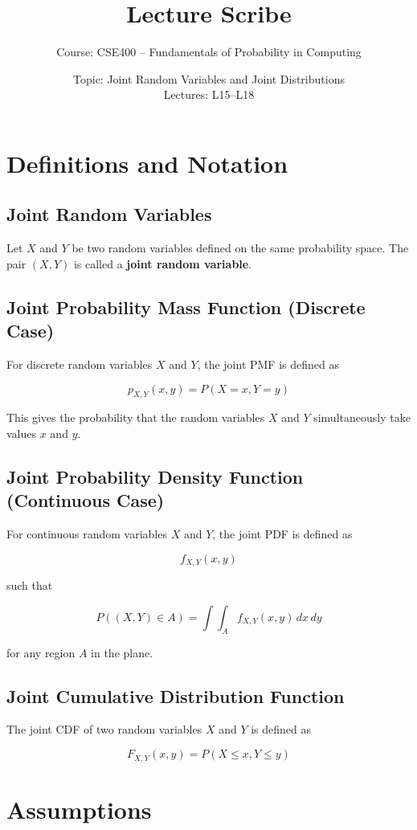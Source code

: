 \documentclass[12pt]{article}
\title{Lecture Scribe}
\author{Course: CSE400 -- Fundamentals of Probability in Computing}
\date{Topic: Joint Random Variables and Joint Distributions \\ Lectures: L15--L18}
\begin{document}
\maketitle

\section{Definitions and Notation}

\subsection{Joint Random Variables}

Let $X$ and $Y$ be two random variables defined on the same probability space.  
The pair $(X,Y)$ is called a \textbf{joint random variable}.

\subsection{Joint Probability Mass Function (Discrete Case)}

For discrete random variables $X$ and $Y$, the joint PMF is defined as

\[
p_{X,Y}(x,y) = P(X = x, Y = y)
\]

This gives the probability that the random variables $X$ and $Y$ simultaneously take values $x$ and $y$.

\subsection{Joint Probability Density Function (Continuous Case)}

For continuous random variables $X$ and $Y$, the joint PDF is defined as

\[
f_{X,Y}(x,y)
\]

such that

\[
P((X,Y) \in A) = \int\int_A f_{X,Y}(x,y)\, dx\, dy
\]

for any region $A$ in the plane.

\subsection{Joint Cumulative Distribution Function}

The joint CDF of two random variables $X$ and $Y$ is defined as

\[
F_{X,Y}(x,y) = P(X \le x, Y \le y)
\]

\section{Assumptions}
\end{document}
